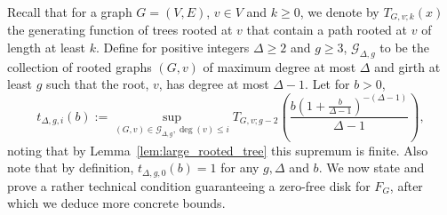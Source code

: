 \documentclass[a4paper,11pt,reqno]{amsart}
\numberwithin{equation}{section}
\begin{document}
Recall that for a graph $G=(V,E)$, $v\in V$ and $k\geq 0$, we denote by $T_{G,v;k}(x)$ the generating function of trees rooted at $v$ that contain a path rooted at $v$ of length at least $k$.
Define for positive integers $\Delta\geq 2$ and $g\geq 3$, $\mathcal{G}_{\Delta,g}$ to be the collection of rooted graphs $(G,v)$ of maximum degree at most $\Delta$ and girth at least $g$ such that the root, $v$, has degree at most $\Delta-1$.
Let for $b>0$, 
\begin{equation}\label{eq:define tree upper bound}
    t_{\Delta,g,i}(b):=\sup_{(G,v)\in \mathcal{G}_{\Delta,g}, \deg(v)\leq i} T_{G,v;g-2}\left(\frac{b(1+\tfrac{b}{\Delta-1})^{-(\Delta-1)}}{\Delta-1}\right),
\end{equation}
noting that by Lemma~\ref{lem:large_rooted_tree} this supremum is finite. Also note that by definition, $t_{\Delta,g,0}(b)=1$ for any $g,\Delta$ and $b$.
We now state and prove a rather technical condition guaranteeing a zero-free disk for $F_G$, after which we deduce more concrete bounds.
\end{document}
